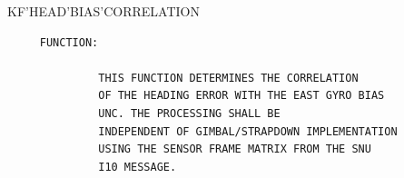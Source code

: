 \begin{frame}
KF'HEAD'BIAS'CORRELATION
\begin{verbatim}
     FUNCTION:

              THIS FUNCTION DETERMINES THE CORRELATION
              OF THE HEADING ERROR WITH THE EAST GYRO BIAS
              UNC. THE PROCESSING SHALL BE
              INDEPENDENT OF GIMBAL/STRAPDOWN IMPLEMENTATION
              USING THE SENSOR FRAME MATRIX FROM THE SNU
              I10 MESSAGE.

\end{verbatim}
\end{frame}
